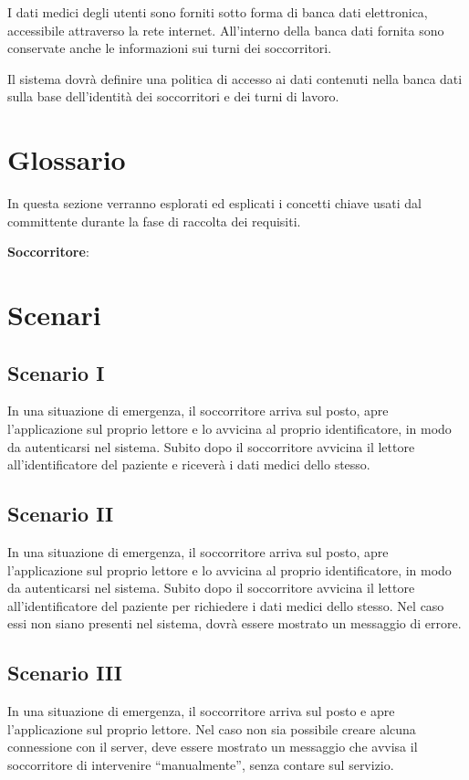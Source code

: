 \documentclass[a4paper,12pt]{report}
\begin{document}
I dati medici degli utenti sono forniti sotto forma di banca dati elettronica, accessibile attraverso la rete internet. All'interno della banca dati fornita sono conservate anche le informazioni sui turni dei soccorritori. 

Il sistema dovrà definire una politica di accesso ai dati contenuti nella banca dati sulla base dell'identità dei soccorritori e dei turni di lavoro. 

\section{Glossario}
In questa sezione verranno esplorati ed esplicati i concetti chiave usati dal committente durante la fase di raccolta dei requisiti. 
\begin{itemize}
	\textbf{Soccorritore}: 
\end{itemize}

\section{Scenari}
\subsection{Scenario I}
In una situazione di emergenza, il soccorritore arriva sul posto, apre l'applicazione sul proprio lettore e lo avvicina al proprio identificatore, in modo da autenticarsi nel sistema. Subito dopo il soccorritore avvicina il lettore all'identificatore del paziente e riceverà i dati medici dello stesso. 
\subsection{Scenario II}
In una situazione di emergenza, il soccorritore arriva sul posto, apre l'applicazione sul proprio lettore e lo avvicina al proprio identificatore, in modo da autenticarsi nel sistema. Subito dopo il soccorritore avvicina il lettore all'identificatore del paziente per richiedere i dati medici dello stesso. Nel caso essi non siano presenti nel sistema, dovrà essere mostrato un messaggio di errore.
\subsection{Scenario III} 
In una situazione di emergenza, il soccorritore arriva sul posto e apre l'applicazione sul proprio lettore. Nel caso non sia possibile creare alcuna connessione con il server, deve essere mostrato un messaggio che avvisa il soccorritore di intervenire ``manualmente'', senza contare sul servizio.
\end{document}
